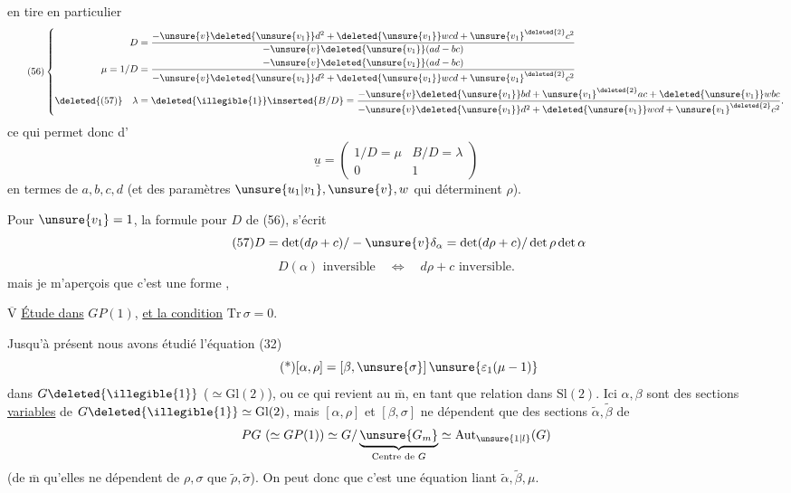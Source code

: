  en tire en particulier
\[
\tag{56}
\left\{
\begin{aligned}
D&=\frac{-\unsure{v}\deleted{\unsure{v_1}}d^2+
\deleted{\unsure{v_1}}wcd+\unsure{v_1}^{\deleted{2}}c^2}
{-\unsure{v}\deleted{\unsure{v_1}}(ad-bc)}\\
\mu=1/D&=\frac{-\unsure{v}\deleted{\unsure{v_1}}(ad-bc)}
{-\unsure{v}\deleted{\unsure{v_1}}d^2+
\deleted{\unsure{v_1}}wcd+\unsure{v_1}^{\deleted{2}}c^2}\\
\deleted{(57)}\quad\lambda&=\deleted{\illegible{1}}\inserted{B/D}
=\frac{-\unsure{v}\deleted{\unsure{v_1}}bd+\unsure{v_1}^{\deleted{2}}ac+
\deleted{\unsure{v_1}}wbc}
{-\unsure{v}\deleted{\unsure{v_1}}d^2+
\deleted{\unsure{v_1}}wcd+\unsure{v_1}^{\deleted{2}}c^2}.
\end{aligned}
\right.
\]
ce qui permet donc d'
\[
\underline{u}=\begin{pmatrix}1/D=\mu&B/D=\lambda\\0&1\end{pmatrix}
\]
en termes de $a,b,c,d$ (et des paramètres $\unsure{u_1|v_1},\unsure{v},w$
qui déterminent $\rho$).

Pour \uline{$\unsure{v_1}=1$}, la formule pour $D$ de (56), s'écrit
\[
\tag{57}
D=\det(d\rho+c)/-\unsure{v}\delta_\alpha
=\det(d\rho+c)/\det\rho\det\alpha
\]
\[
\tag{58}
D(\alpha)\text{ inversible}\quad\Longleftrightarrow\quad
d\rho+c\text{ inversible}.
\]
mais je m'aperçois que c'est une forme ,


\uline{$\overline{\mathrm V}$}\qquad
\uline{Étude}\uline{ dans}
$GP(1)$, \uline{et la condition} $\mathrm{Tr}\,\sigma=0$.

Jusqu'à présent nous avons étudié l'équation (32)
\[
\tag{*}
[\alpha,\rho]=[\beta,\unsure{\sigma}]\,
\unsure{\varepsilon_1(\mu-1)}
\]
dans $G\deleted{\illegible{1}}$ ($\simeq\mathrm{Gl}(2)$), ou ce qui revient au
$\overline{\mathrm m}$,  en tant que relation dans $\mathrm{Sl}(2)$.
Ici $\alpha,\beta$ sont des sections \uline{variables} de
$G\deleted{\illegible{1}}\simeq\mathrm{Gl}(2)$, mais $[\alpha,\rho]$ et
$[\beta,\sigma]$ ne dépendent que des sections 
$\widetilde\alpha,\widetilde\beta$ de
\[
PG\ (\simeq GP(1))\simeq
G/\underbrace{\unsure{G_m}}_{\text{Centre de }G}
\simeq\mathrm{Aut}_{\unsure{1|l}}(G)
\]
(de $\overline{\mathrm m}$ qu'elles ne dépendent de $\rho,\sigma$ que
 $\widetilde\rho,\widetilde\sigma$).
On peut donc  que c'est une équation
liant $\widetilde\alpha,\widetilde\beta,\mu$.

